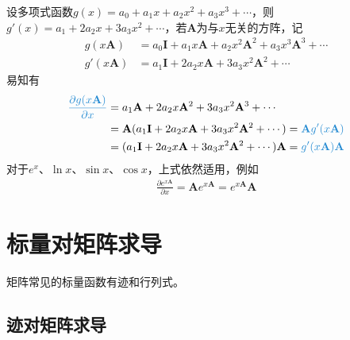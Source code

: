 \documentclass{ctexart}
\newcommand{\blue}[1]{\textcolor{Solarized-blue}{#1}}
\theoremstyle{definition}
\def \Av {\mathbf{A}}
\def \Iv {\mathbf{I}}
\begin{document}
设多项式函数$g(x) = a_0 + a_1 x + a_2 x^2 + a_3 x^3 + \cdots$，则$g'(x) = a_1 + 2 a_2 x + 3 a_3 x^2 + \cdots$，若$\Av$为与$x$无关的方阵，记
\begin{align*}
    g (x \Av)  & = a_0 \Iv + a_1 x \Av + a_2 x^2 \Av^2 + a_3 x^3 \Av^3 + \cdots \\
    g' (x \Av) & = a_1 \Iv + 2 a_2 x \Av + 3 a_3 x^2 \Av^2 + \cdots
\end{align*}
易知有
\begin{align*}
    \blue{\frac{\partial g(x \Av)}{\partial x}} & = a_1 \Av + 2 a_2 x \Av^2 + 3 a_3 x^2 \Av^3 + \cdots                             \\
                                                & = \Av (a_1 \Iv + 2 a_2 x \Av + 3 a_3 x^2 \Av^2 + \cdots) = \blue{\Av g' (x \Av)} \\
                                                & = (a_1 \Iv + 2 a_2 x \Av + 3 a_3 x^2 \Av^2 + \cdots) \Av = \blue{g' (x \Av) \Av}
\end{align*}
对于$e^x$、$\ln x$、$\sin x$、$\cos x$，上式依然适用，例如
\begin{align*}
    \frac{\partial e^{x \Av}}{\partial x} = \Av e^{x \Av} = e^{x \Av} \Av
\end{align*}

\section{标量对矩阵求导}

矩阵常见的标量函数有\blue{迹}和\blue{行列式}。

\subsection{迹对矩阵求导}
\end{document}
